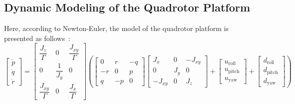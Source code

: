 \documentclass[3p]{elsarticle}
\begin{document}
\subsection{Dynamic Modeling of the Quadrotor Platform}
\noindent Here, according to Newton-Euler, the model of the quadrotor platform is presented as follows~\cite{4399042, article_Bouabdallah, beard2012small}:
\begin{equation}
    \begin{bmatrix}
        \dot p \\
        \dot q \\
        \dot r
    \end{bmatrix} = \begin{bmatrix}
        \dfrac{J_z}{\Gamma} & 0 & \dfrac{J_{xy}}{\Gamma} \\
        0 & \dfrac{1}{J_y} & 0 \\
        \dfrac{J_{xy}}{\Gamma} & 0 & \dfrac{J_x}{\Gamma}
    \end{bmatrix} \left(
        \begin{bmatrix}
            0 & r & -q \\
            -r & 0 & p \\
            q & -p & 0
        \end{bmatrix}\begin{bmatrix}
            J_x & 0 & -J_{xy} \\
            0 & J_y & 0 \\
            -J_{xy} & 0 & J_z
        \end{bmatrix} +
        \begin{bmatrix}
            u_{\text{roll}} \\
            u_{\text{pitch}} \\
            u_{\text{yaw}}
        \end{bmatrix} + \begin{bmatrix}
            d_{\text{roll}} \\
            d_{\text{pitch}} \\
            d_{\text{yaw}}
        \end{bmatrix}
    \right)
\end{equation}
\end{document}
